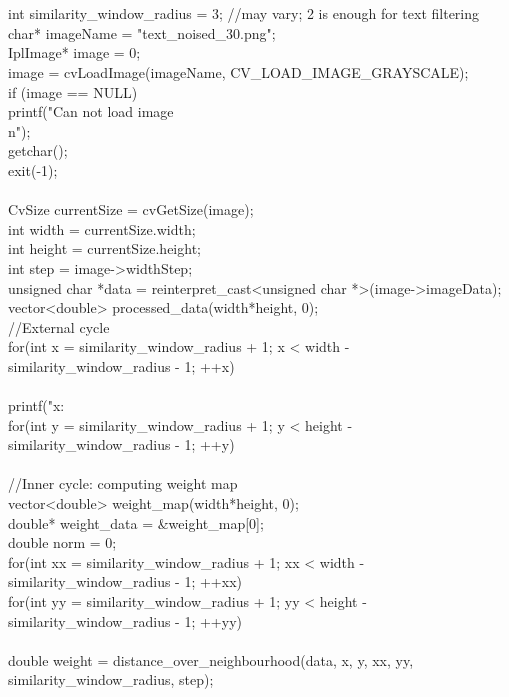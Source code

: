 \documentclass[a4paper,12pt]{article}
\begin{document}
\\{
\\	int similarity\_window\_radius = 3; //may vary; 2 is enough for text filtering
\\	char* imageName = "text\_noised\_30.png";
\\    IplImage* image = 0;
\\	image = cvLoadImage(imageName, CV\_LOAD\_IMAGE\_GRAYSCALE);
\\	if (image == NULL) {
\\		printf("Can not load image\\n");
\\		getchar();
\\		exit(-1);
\\	}
\\	CvSize currentSize = cvGetSize(image);
\\	int width = currentSize.width;
\\	int height = currentSize.height;
\\	int step = image->widthStep;
\\	unsigned char *data = reinterpret\_cast<unsigned char *>(image->imageData);
\\	vector<double> processed\_data(width*height, 0);
\\	//External cycle
\\	for(int x = similarity\_window\_radius + 1; x < width - similarity\_window\_radius - 1; ++x) 
\\	{
\\		printf("x: %
\\		for(int y = similarity\_window\_radius + 1; y < height - similarity\_window\_radius - 1; ++y) 
\\		{
\\			//Inner cycle: computing weight map
\\			vector<double> weight\_map(width*height, 0);
\\			double* weight\_data = \&weight\_map[0];
\\			double norm = 0;
\\			for(int xx = similarity\_window\_radius + 1; xx < width - similarity\_window\_radius - 1; ++xx)
\\				for(int yy = similarity\_window\_radius + 1; yy < height - similarity\_window\_radius - 1; ++yy)
\\				{
\\                    double weight = distance\_over\_neighbourhood(data, x, y, xx, yy, similarity\_window\_radius, step);
}}}}
\end{document}
